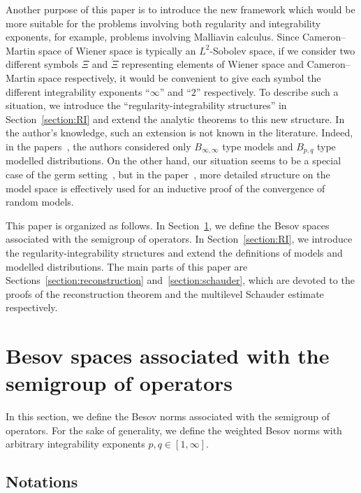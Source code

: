 \documentclass[AHL,Unicode,longabstracts,published]{cedram}
\begin{document}
Another purpose of this paper is to introduce the new framework which would be more suitable for the problems involving both regularity and integrability exponents, for example, problems involving Malliavin calculus. Since Cameron--Martin space of Wiener space is typically an $L^2$-Sobolev space, if we consider two different symbols $\Xi$ and $\dot{\Xi}$ representing elements of Wiener space and Cameron--Martin space respectively, it would be convenient to give each symbol the different integrability exponents ``$\infty$'' and ``$2$'' respectively. To describe such a situation, we introduce the ``regularity-integrability structures'' in Section~\ref{section:RI} and extend the analytic theorems to this new structure. In the author's knowledge, such an extension is not known in the literature. Indeed, in the papers~\cite{HL17, LPT21,ST18}, the authors considered only $B_{\infty,\infty}$ type models and $B_{p,q}$ type modelled distributions. On the other hand, our situation seems to be a special case of the germ setting~\cite{BL22}, but in the paper~\cite{BPHZ}, more detailed structure on the model space is effectively used for an inductive proof of the convergence of random models.


This paper is organized as follows. In Section~\ref{section:semigroup}, we define the Besov spaces associated with the semigroup of operators. In Section~\ref{section:RI}, we introduce the regularity-integrability structures and extend the definitions of models and modelled distributions. The main parts of this paper are Sections~\ref{section:reconstruction} and~\ref{section:schauder}, which are devoted to the proofs of the reconstruction theorem and the multilevel Schauder estimate respectively.

\section{Besov spaces associated with the semigroup of operators}\label{section:semigroup}

In this section, we define the Besov norms associated with the semigroup of operators. For the sake of generality, we define the weighted Besov norms with arbitrary integrability exponents $p,q\in[1,\infty]$.

\subsection{Notations}\label{subsection:notation}
\end{document}
